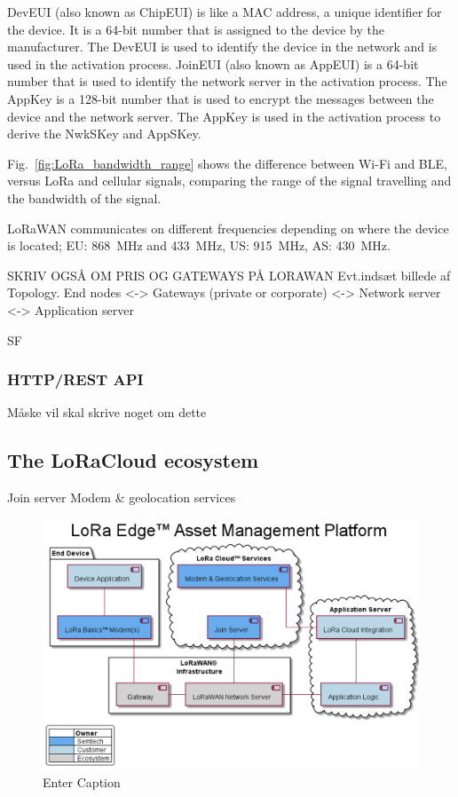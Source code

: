 \ac{DevEUI} (also known as ChipEUI) is like a \ac{MAC} address, a unique identifier for the device. It is a 64-bit number that is assigned to the device by the manufacturer. The \ac{DevEUI} is used to identify the device in the network and is used in the activation process. \ac{JoinEUI} (also known as AppEUI) is a 64-bit number that is used to identify the network server in the activation process. The AppKey is a 128-bit number that is used to encrypt the messages between the device and the network server. The AppKey is used in the activation process to derive the NwkSKey and AppSKey.



Fig.~\ref{fig:LoRa_bandwidth_range} shows the difference between Wi-Fi and \ac{BLE}, versus \ac{LoRa} and cellular signals, comparing the range of the signal travelling and the bandwidth of the signal.

\ac{LoRaWAN} communicates on different frequencies depending on where the device is located; EU: \SI{868}{\mega\hertz} and \SI{433}{\mega\hertz}, US: \SI{915}{\mega\hertz}, AS: \SI{430}{\mega\hertz}.

SKRIV OGSÅ OM PRIS OG GATEWAYS PÅ LORAWAN
Evt.indsæt billede af Topology. End nodes <-> Gateways (private or corporate) <-> Network server <-> Application server

\ac{SF}

\subsubsection{HTTP/REST API}
Måske vil skal skrive noget om dette

\subsection{The LoRaCloud ecosystem}
Join server
Modem \& geolocation services

\begin{figure}
    \centering
    \includegraphics[width=0.5\linewidth]{figures/image2.png}
    \caption{Enter Caption}
\end{figure}

